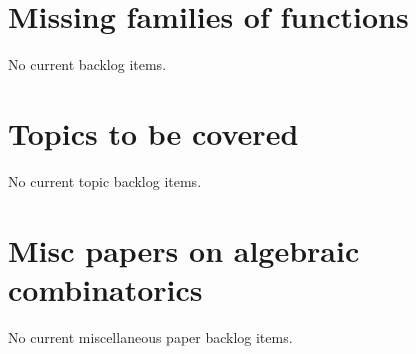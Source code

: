 



\section[metaWriteFamilies]{Missing families of functions}

No current backlog items.

\section[metaWriteTopics]{Topics to be covered}

No current topic backlog items.

\section[metaPapers]{Misc papers on algebraic combinatorics}

No current miscellaneous paper backlog items.

